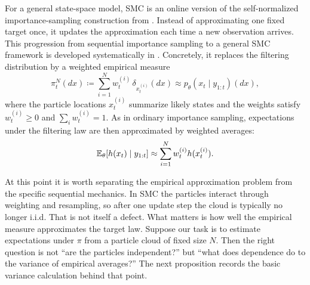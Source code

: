 For a general state-space model, SMC is an online version of the self-normalized importance-sampling construction from .
Instead of approximating one fixed target once, it updates the approximation each time a new observation arrives.
This progression from sequential importance sampling to a general SMC framework is developed systematically in \citet[\S2.6.3 and Ch.~3]{liu_2002_monte_carlo}.
Concretely, it replaces the filtering distribution by a weighted empirical measure
\begin{equation}
  \pi_t^N(dx)
  \coloneqq
  \sum_{i=1}^N w_t^{(i)}\,\delta_{x_t^{(i)}}(dx)
  \approx
  p_\theta(x_t \mid y_{1:t})(dx),
  \label{eq:smc-empirical-measure}
\end{equation}
where the particle locations $x_t^{(i)}$ summarize likely states and the weights satisfy $w_t^{(i)}\ge 0$ and $\sum_i w_t^{(i)}=1$.
As in ordinary importance sampling, expectations under the filtering law are then approximated by weighted averages:
\begin{equation}
  \mathbb{E}_\theta[h(x_t)\mid y_{1:t}]
  \approx
  \sum_{i=1}^N w_t^{(i)} h(x_t^{(i)}).
  \label{eq:smc-expectation}
\end{equation}

At this point it is worth separating the empirical approximation problem from the specific sequential mechanics.
In SMC the particles interact through weighting and resampling, so after one update step the cloud is typically no longer i.i.d.
That is not itself a defect.
What matters is how well the empirical measure approximates the target law.
Suppose our task is to estimate expectations under \(\pi\) from a particle cloud of fixed size \(N\).
Then the right question is not ``are the particles independent?'' but ``what does dependence do to the variance of empirical averages?''
The next proposition records the basic variance calculation behind that point.

